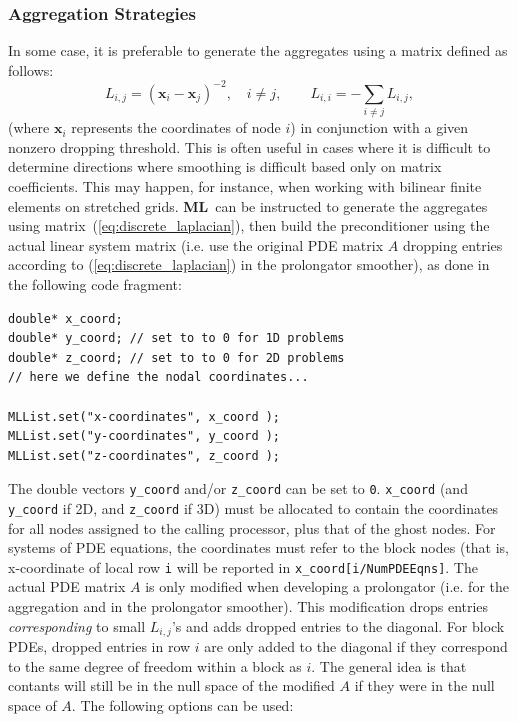\documentclass{article}[11pt]
\newcommand{\ML}     {{\bf ML}}
\begin{document}

\subsubsection{Aggregation Strategies}
\label{sec:MLP:auxiliary}

In some case, it is preferable to generate the aggregates using a
matrix defined as follows:
\begin{equation}
L_{i,j} = (\mathbf{x}_i - \mathbf{x}_j)^{-2}, \quad i \neq j, \quad \quad
L_{i,i} = - \sum_{i \neq j} L_{i,j},
\label{eq:discrete_laplacian}
\end{equation}
(where $\mathbf{x}_i$ represents the coordinates of node $i$)
in conjunction with a given nonzero dropping threshold.
This is often useful in cases where it is difficult to determine 
directions where smoothing is difficult based only on matrix coefficients.
This may happen, for instance, when working with bilinear finite 
elements on stretched grids. 
\ML~can be instructed to generate the aggregates using
matrix~(\ref{eq:discrete_laplacian}), then build the preconditioner 
using the actual linear system matrix (i.e. use the original PDE matrix
$A$ dropping entries according to (\ref{eq:discrete_laplacian}) in 
the prolongator smoother), as done in the following code fragment:
\begin{verbatim}
double* x_coord;
double* y_coord; // set to to 0 for 1D problems
double* z_coord; // set to to 0 for 2D problems
// here we define the nodal coordinates...

MLList.set("x-coordinates", x_coord );
MLList.set("y-coordinates", y_coord );
MLList.set("z-coordinates", z_coord );
\end{verbatim}
The double vectors \verb!y_coord! and/or \verb!z_coord! can be set to \verb!0!.
\verb!x_coord! (and \verb!y_coord! if 2D, and
\verb!z_coord! if 3D) must be allocated to contain the coordinates for all
nodes assigned to the calling processor, plus that of the ghost nodes. For
systems of PDE equations, the coordinates must refer to the block nodes (that
is, x-coordinate of local row \verb!i! will be reported in
\verb!x_coord[i/NumPDEEqns]!. The actual PDE matrix $A$ is only modified 
when developing a prolongator (i.e. for the aggregation and in the 
prolongator smoother). This modification drops entries {\it corresponding}
to small $L_{i,j}$'s and adds dropped entries to the diagonal. For block 
PDEs, dropped entries in row $i$ are only added to the diagonal if they 
correspond to the same degree of freedom within a block as $i$. The 
general idea is that contants will still be in the null space of the
modified $A$ if they were in the null space of $A$.
The following options can be used:
\smallskip
\end{document}
